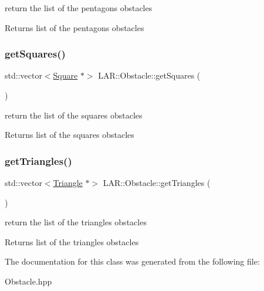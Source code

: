 return the list of the pentagons obstacles \begin{DoxyReturn}{Returns}
list of the pentagons obstacles 
\end{DoxyReturn}
\mbox{\label{class_l_a_r_1_1_obstacle_a2fa87a62ae0c59e84b18363eb3d94505}} 
\subsubsection{\texorpdfstring{get\+Squares()}{getSquares()}}
{\footnotesize\ttfamily std\+::vector$<$\mbox{\hyperlink{class_geometry2_d_1_1_square}{Square}} $\ast$$>$ L\+A\+R\+::\+Obstacle\+::get\+Squares (\begin{DoxyParamCaption}{ }\end{DoxyParamCaption})}

return the list of the squares obstacles \begin{DoxyReturn}{Returns}
list of the squares obstacles 
\end{DoxyReturn}
\mbox{\label{class_l_a_r_1_1_obstacle_a3cf38a39212e094c8712e3abfd3fd355}} 
\subsubsection{\texorpdfstring{get\+Triangles()}{getTriangles()}}
{\footnotesize\ttfamily std\+::vector$<$\mbox{\hyperlink{class_geometry2_d_1_1_triangle}{Triangle}} $\ast$$>$ L\+A\+R\+::\+Obstacle\+::get\+Triangles (\begin{DoxyParamCaption}{ }\end{DoxyParamCaption})}

return the list of the triangles obstacles \begin{DoxyReturn}{Returns}
list of the triangles obstacles 
\end{DoxyReturn}


The documentation for this class was generated from the following file\+:\begin{DoxyCompactItemize}
\item 
Obstacle.\+hpp\end{DoxyCompactItemize}
